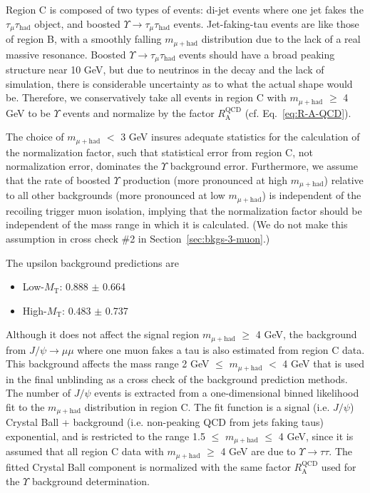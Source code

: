Region C is composed of two types of events: di-jet events where one jet fakes the $\tau_{\mu}\tau_{\text{had}}$ object, and boosted $\Upsilon\rightarrow\tau_{\mu}\tau_{\text{had}}$ events.  Jet-faking-tau events are like those of region B, with a smoothly falling $m_{\mu+\text{had}}$ distribution due to the lack of a real massive resonance.  Boosted $\Upsilon\rightarrow\tau_{\mu}\tau_{\text{had}}$ events should have a broad peaking structure near 10 GeV, but due to neutrinos in the decay and the lack of simulation, there is considerable uncertainty as to what the actual shape would be.  Therefore, we conservatively take all events in region C with $m_{\mu+\text{had}}$ $\geq$ 4 GeV to be $\Upsilon$ events and normalize by the factor $R_{\text{A}}^{\text{QCD}}$ (cf. Eq.~\ref{eq:R-A-QCD}).

The choice of $m_{\mu+\text{had}}$ $<$ 3 GeV insures adequate statistics for the calculation of the normalization factor, such that statistical error from region C, not normalization error, dominates the $\Upsilon$ background error.  Furthermore, we assume that the rate of boosted $\Upsilon$ production (more pronounced at high $m_{\mu+\text{had}}$) relative to all other backgrounds (more pronounced at low $m_{\mu+\text{had}}$) is independent of the recoiling trigger muon isolation, implying that the normalization factor should be independent of the mass range in which it is calculated.  (We do not make this assumption in cross check \#2 in Section~\ref{sec:bkgs-3-muon}.)

The upsilon background predictions are

\begin{itemize}
\item Low-$M_{\text{T}}$: 0.888 $\pm$ 0.664 \stat
\item High-$M_{\text{T}}$: 0.483 $\pm$ 0.737 \stat
\end{itemize}

Although it does not affect the signal region $m_{\mu+\text{had}}$ $\geq$ 4 GeV, the background from $J\slash\psi\rightarrow\mu\mu$ where one muon fakes a tau is also estimated from region C data.  This background affects the mass range 2 GeV $\leq$ $m_{\mu+\text{had}}$ $<$ 4 GeV that is used in the final unblinding as a cross check of the background prediction methods.  The number of $J\slash\psi$ events is extracted from a one-dimensional binned likelihood fit to the $m_{\mu+\text{had}}$ distribution in region C.  The fit function is a signal (i.e. $J\slash\psi$) Crystal Ball + background (i.e. non-peaking QCD from jets faking taus) exponential, and is restricted to the range 1.5 $\leq$ $m_{\mu+\text{had}}$ $\leq$ 4 GeV, since it is assumed that all region C data with $m_{\mu+\text{had}}$ $\geq$ 4 GeV are due to $\Upsilon\rightarrow\tau\tau$.  The fitted Crystal Ball component is normalized with the same factor $R_{\text{A}}^{\text{QCD}}$ used for the $\Upsilon$ background determination.

